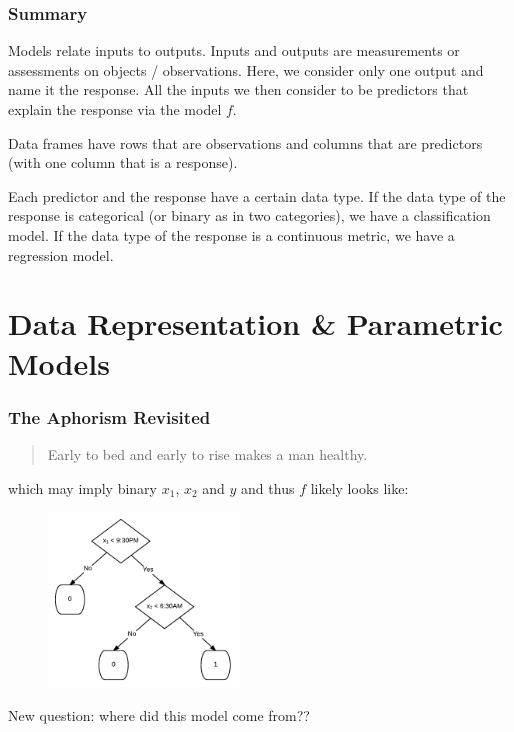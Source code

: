 \documentclass[slides]{beamer} %
\begin{document}
\begin{frame}\frametitle{Summary}

Models relate inputs to outputs. Inputs and outputs are measurements or assessments on objects / observations.  Here, we consider only one output and name it the response.  \pause All the inputs we then consider to be predictors that explain the response via the model $f$.  \pause 

Data frames have rows that are observations and columns that are predictors (with one column that is a response).  \pause 

Each predictor and the response have a certain data type.  \pause If the data type of the response is categorical (or binary as in two categories), we have a classification model. If the data type of the response is a continuous metric, we have a regression model.
	
\end{frame}

\section{Data Representation \& Parametric Models}

\begin{frame}\frametitle{The Aphorism Revisited}

\small
\begin{quotation}
Early to bed and early to rise makes a man healthy.
\end{quotation}

which may imply binary $x_1$, $x_2$ and $y$ and thus $f$ likely looks like:

\begin{figure}
\centering
\includegraphics[width=2in]{simple_health}
\end{figure}

New question: where did this model come from??
	
\end{frame}
\end{document}
